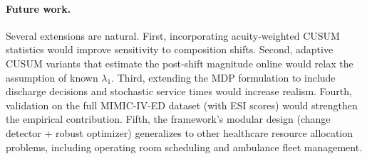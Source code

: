 \documentclass[11pt,twocolumn]{article}
\theoremstyle{plain}
\theoremstyle{definition}
\begin{document}
\paragraph{Future work.} Several extensions are natural. First, incorporating acuity-weighted CUSUM statistics would improve sensitivity to composition shifts. Second, adaptive CUSUM variants that estimate the post-shift magnitude online would relax the assumption of known $\lambda_1$. Third, extending the MDP formulation to include discharge decisions and stochastic service times would increase realism. Fourth, validation on the full MIMIC-IV-ED dataset (with ESI scores) would strengthen the empirical contribution. Fifth, the framework's modular design (change detector + robust optimizer) generalizes to other healthcare resource allocation problems, including operating room scheduling and ambulance fleet management.



\end{document}
